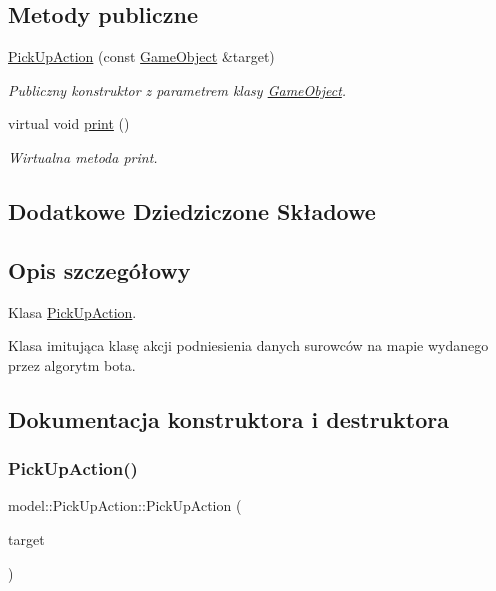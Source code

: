 \subsection*{Metody publiczne}
\begin{DoxyCompactItemize}
\item 
\hyperlink{classmodel_1_1PickUpAction_a7f3953e6ebdfdb1260cd745fa7fc2b8d}{Pick\+Up\+Action} (const \hyperlink{classmodel_1_1GameObject}{Game\+Object} \&target)
\begin{DoxyCompactList}\small\item\em Publiczny konstruktor z parametrem klasy \hyperlink{classmodel_1_1GameObject}{Game\+Object}. \end{DoxyCompactList}\item 
virtual void \hyperlink{classmodel_1_1PickUpAction_a8e3d6499d8eb1f99566e0b5b3e6661c9}{print} ()
\begin{DoxyCompactList}\small\item\em Wirtualna metoda print. \end{DoxyCompactList}\end{DoxyCompactItemize}
\subsection*{Dodatkowe Dziedziczone Składowe}


\subsection{Opis szczegółowy}
Klasa \hyperlink{classmodel_1_1PickUpAction}{Pick\+Up\+Action}. 

Klasa imitująca klasę akcji podniesienia danych surowców na mapie wydanego przez algorytm bota. 

\subsection{Dokumentacja konstruktora i destruktora}
\mbox{\label{classmodel_1_1PickUpAction_a7f3953e6ebdfdb1260cd745fa7fc2b8d}} 
\subsubsection{\texorpdfstring{Pick\+Up\+Action()}{PickUpAction()}}
{\footnotesize\ttfamily model\+::\+Pick\+Up\+Action\+::\+Pick\+Up\+Action (\begin{DoxyParamCaption}\item[{const \hyperlink{classmodel_1_1GameObject}{Game\+Object} \&}]{target }\end{DoxyParamCaption})\hspace{0.3cm}{\ttfamily [inline]}}



